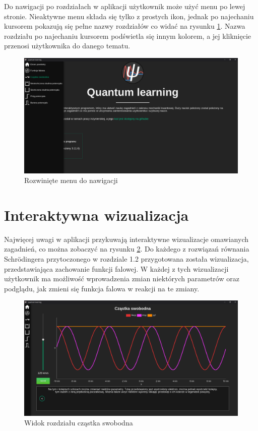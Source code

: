 \documentclass{SGGW-thesis}
\begin{document}
	Do nawigacji po rozdziałach w aplikacji użytkownik może użyć menu po lewej stronie. Nieaktywne menu składa się tylko z prostych ikon, jednak po najechaniu kursorem pokazują się pełne nazwy rozdziałów co widać na rysunku \ref{fig:menu-unfolded}. Nazwa rozdziału po najechaniu kursorem podświetla się innym kolorem, a jej kliknięcie przenosi użytkownika do danego tematu.
	
	\begin{figure}[H]
	\includegraphics[width=\textwidth,height=\textheight,keepaspectratio]{menu unfolded.png} 
	\caption{Rozwinięte menu do nawigacji}
	\label{fig:menu-unfolded}
	\end{figure}
	
	\section{Interaktywna wizualizacja}
	Najwięcej uwagi w aplikacji przykuwają interaktywne wizualizacje omawianych zagadnień, co można zobaczyć na rysunku \ref{fig:free-chart}. Do każdego z rozwiązań równania Schrödingera przytoczonego w rozdziale 1.2 przygotowana została wizualizacja, przedstawiająca zachowanie funkcji falowej. W każdej z tych wizualizacji użytkownik ma możliwość wprowadzenia zmian niektórych parametrów oraz podglądu, jak zmieni się funkcja falowa w reakcji na te zmiany.
	
	\begin{figure}[H]
	\includegraphics[width=\textwidth,height=\textheight,keepaspectratio]{free.png} 
	\caption{Widok rozdziału cząstka swobodna}
	\label{fig:free-chart}
	\end{figure}	
	
\end{document}
